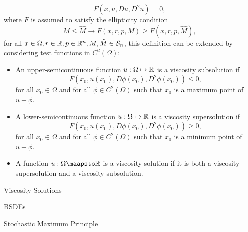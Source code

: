 \begin{equation}
    F(x, u, D u, D^2 u) = 0,
\end{equation}
where $F$ is assumed to satisfy the ellipticity condition
\begin{equation}
    M \leq \hat M \rightarrow F(x,r,p,M) \geq F(x,r,p,\hat M),
\end{equation}
for all $x \in \Omega, r \in \mathbb{R}, p \in \mathbb{R}^n, M,\hat M \in \mathcal{S}_n$,
this definition can be extended by considering test functions in $C^2(\Omega)$:
\begin{definition}
    \begin{itemize}
        \item An upper-semicontinuous function $u : \Omega \mapsto \mathbb{R}$ is a viscosity subsolution if
    \begin{equation*}
        F(x_0, u(x_0), D \phi(x_0), D^2 \phi(x_0)) \leq 0,
    \end{equation*}
    for all $x_0 \in \Omega$ and for all $\phi \in C^2(\Omega)$ such that $x_0$ is a maximum point of $u - \phi$.
        \item A lower-semicontinuous function $u : \Omega \mapsto \mathbb{R}$ is a viscosity supersolution if
    \begin{equation*}
        F(x_0, u(x_0), D\phi(x_0), D^2 \phi(x_0)) \geq 0,
    \end{equation*}
    for all $x_0 \in \Omega$ and for all $\phi \in C^2(\Omega)$ such that $x_0$ is a minimum point of $u - \phi$.
        \item A function $u : \Omega \maapsto \RR$ is a viscosity solution if it is both
        a viscosity supersolution and a viscosity subsolution.
    \end{itemize}
\end{definition}




Viscosity Solutions


BSDEs

Stochastic Maximum Principle